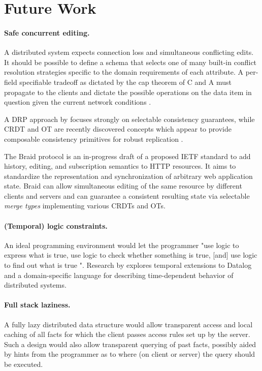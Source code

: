 \cleardoublepage
\section{Future Work}

\paragraph{Safe concurrent editing.}
A distributed system expects connection loss and simultaneous conflicting edits. It should be possible to define a schema that selects one of many built-in conflict resolution strategies specific to the domain requirements of each attribute. A per-field specifiable tradeoff as dictated by the \gls{cap} theorem of C and A must propagate to the clients and dictate the possible operations on the data item in question given the current network conditions \cite{emerick2014api}.


A \gls{DRP} approach by \cite{margara2014we} focuses strongly on selectable consistency guarantees, while \gls{CRDT} and \gls{OT} are recently discovered concepts which appear to provide composable consistency primitives for robust replication \cite{weilbach2015replikativ, weilbach2016decoupling}.

The Braid protocol \cite{braid19} is an in-progress draft of a proposed \gls{IETF} standard to add history, editing, and subscription semantics to HTTP resources. It aims to standardize the representation and synchronization of arbitrary web application state. Braid can allow simultaneous editing of the same resource by different clients and servers and can guarantee a consistent resulting state via selectable \emph{merge types} implementing various CRDTs and OTs.


\paragraph{(Temporal) logic constraints.} An ideal programming environment would let the programmer "use logic to express what is true, use logic to check whether something is true, [and] use logic to find out what is true \cite{sicp}". Research by \cite{alvaro2010dedalus,alvaro2011consistency} explores temporal extensions to Datalog and a domain-specific language for describing time-dependent behavior of distributed systems.

\paragraph{Full stack laziness.} A fully lazy distributed data structure would allow transparent access and local caching of all facts for which the client passes access rules set up by the server. Such a design would also allow transparent querying of past facts, possibly aided by hints from the programmer as to where (on client or server) the query should be executed.

